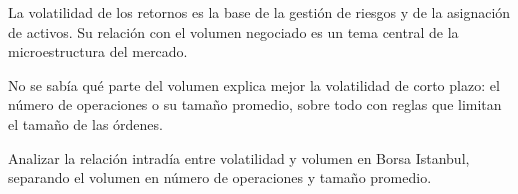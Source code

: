 \documentclass{article}
\newcommand{\bodysize}{\fontsize{31}{40.9}\selectfont}
\newcommand{\cardtitlesize}{\fontsize{36.6}{43.9}\selectfont}
\newcommand{\smallsize}{\fontsize{25.4}{33.0}\selectfont}
\newcommand{\cardtitle}[2][navy]{{\color{#1}\cardtitlesize\bfseries\textls[110]{\MakeUppercase{#2}}}\par\vspace{7mm}}
\begin{document}
\vfill
\hspace*{34mm}\begin{minipage}{773mm}
\begin{tcolorbox}[enhanced, sharp corners, colback=navy, boxrule=0pt, left=16mm, right=16mm, top=12mm, bottom=11mm,
  fontupper=\bodysize\raggedright, overlay={\fill[gold] (frame.north west) rectangle ([yshift=-5mm]frame.north east);}]
\begin{minipage}[t]{174.8mm}\raggedright{\color{acento}\smallsize\bfseries{}}\par{}\end{minipage}\hfill\begin{minipage}[t]{174.8mm}\raggedright{\color{acento}\smallsize\bfseries{}}\par{}\end{minipage}\hfill\begin{minipage}[t]{174.8mm}\raggedright{\color{acento}\smallsize\bfseries{}}\par{}\end{minipage}\hfill\begin{minipage}[t]{174.8mm}\raggedright{\color{acento}\smallsize\bfseries{}}\par{}\end{minipage}
\end{tcolorbox}
\end{minipage}

\vfill
\hspace*{34mm}\begin{minipage}{773mm}
\begin{tcbraster}[raster columns=3, raster equal height, raster column skip=16mm]
\begin{tcolorbox}[card]\cardtitle{Contexto}La volatilidad de los retornos es la base de la gestión de riesgos y de la asignación de activos. Su relación con el volumen negociado es un tema central de la microestructura del mercado.\end{tcolorbox}
\begin{tcolorbox}[card]\cardtitle{Problema}No se sabía qué parte del volumen explica mejor la volatilidad de corto plazo: el número de operaciones o su tamaño promedio, sobre todo con reglas que limitan el tamaño de las órdenes.\end{tcolorbox}
\begin{tcolorbox}[card]\cardtitle{Objetivo}Analizar la relación intradía entre volatilidad y volumen en Borsa Istanbul, separando el volumen en número de operaciones y tamaño promedio.\end{tcolorbox}
\end{tcbraster}
\end{minipage}
\end{document}
